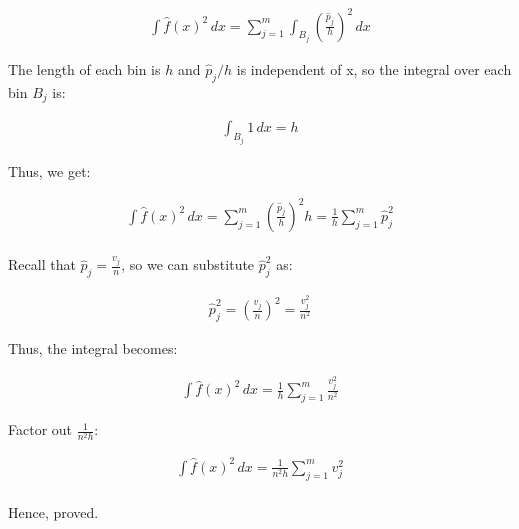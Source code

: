 \begin{align}
\int \hat{f}(x)^2 \, dx = \sum_{j=1}^{m} \int_{B_j} \left( \frac{\hat{p}_j}{h} \right)^2 \, dx
\end{align}

The length of each bin is  $h$ and $ \hat{p}_{j}/h $ is independent of x, so the integral over each bin $B_j$  is:

\begin{align}
\int_{B_j} 1 \, dx = h
\end{align}

Thus, we get:

\begin{align}
\int \hat{f}(x)^2 \, dx = \sum_{j=1}^{m} \left( \frac{\hat{p}_j}{h} \right)^2 h = \frac{1}{h} \sum_{j=1}^{m} \hat{p}_j^2
\end{align}
\\

Recall that \( \hat{p}_j = \frac{v_j}{n} \), so we can substitute \( \hat{p}_j^2 \) as:

\begin{align}
\hat{p}_j^2 = \left( \frac{v_j}{n} \right)^2 = \frac{v_j^2}{n^2}
\end{align}

Thus, the integral becomes:

\begin{align}
\int \hat{f}(x)^2 \, dx = \frac{1}{h} \sum_{j=1}^{m} \frac{v_j^2}{n^2}
\end{align}

Factor out \( \frac{1}{n^2 h} \):

\begin{align}
\int \hat{f}(x)^2 \, dx = \frac{1}{n^2 h} \sum_{j=1}^{m} v_j^2
\end{align}
\\
Hence, proved.
